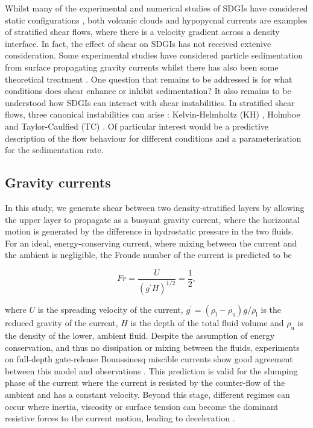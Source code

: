 \documentclass[authoryear,preprint,review,12pt]{elsarticle}
\begin{document}
Whilst many of the experimental and numerical studies of SDGIs have considered static configurations \citep{Chen97, Hoyal99, Blanchette05, Yu14, Burns15, Manzella15, Rouhnia15, Jazi16, Scollo17}, both volcanic clouds and hypopycnal currents are examples of stratified shear flows, where there is a velocity gradient across a density interface. In fact, the effect of shear on SDGIs has not received extenive consideration. Some experimental studies have considered particle sedimentation from surface propagating gravity currents \citep{Maxworthy99, Parsons01, McCool04, Sutherland18, Jazi19} whilst there has also been some theoretical treatment \citep{Farenzena17, Konopliv18}. One question that remains to be addressed is for what conditions does shear enhance or inhibit sedimentation? It also remains to be understood how SDGIs can interact with shear instabilities. In stratified shear flows, three canonical instabilities can arise \citep{Eaves19}: Kelvin-Helmholtz (KH) \citep{Helmholtz68, Kelvin71}, Holmboe \citep{Holmboe62} and Taylor-Caulfied (TC) \citep{Taylor31, Caulfield95}. Of particular interest would be a predictive description of the flow behaviour for different conditions and a parameterisation for the sedimentation rate.

\subsection{Gravity currents}
\label{subsec:grav_curr}

In this study, we generate shear between two density-stratified layers by allowing the upper layer to propagate as a buoyant gravity current, where the horizontal motion is generated by the difference in hydrostatic pressure in the two fluids. For an ideal, energy-conserving current, where mixing between the current and the ambient is negligible, the Froude number of the current is predicted to be \citep{Benjamin68}

\begin{equation}
  \label{equ:Froude}
  Fr = \frac{U}{(g^{\prime} H)^{1/2}} = \frac{1}{2},
\end{equation}

where $U$ is the spreading velocity of the current, $g^{\prime} = (\rho_{\text{l}} - \rho_{\text{u}}) g/ \rho_{\text{l}}$ is the reduced gravity of the current, $H$ is the depth of the total fluid volume and $\rho_{\text{u}}$ is the density of the lower, ambient fluid. Despite the assumption of energy conservation, and thus no dissipation or mixing between the fluids, experiments on full-depth gate-release Bouussinesq miscible currents show good agreement between this model and observations \citep{Keulegan58, Barr67, Shin04}. This prediction is valid for the slumping phase of the current \citep{Huppert80} where the current is resisted by the counter-flow of the ambient and has a constant velocity. Beyond this stage, different regimes can occur where inertia, viscosity or surface tension can become the dominant resistive forces to the current motion, leading to deceleration \citep{Fay69, Hoult72, Simpson97}.
\end{document}

